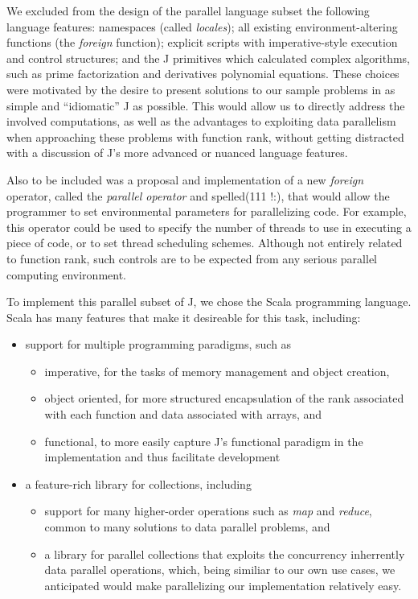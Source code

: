 We excluded from the design of the parallel language subset the following language features: 
namespaces (called \textit{locales});
all existing environment-altering functions (the \textit{foreign} function);
explicit scripts with imperative-style execution and control structures;
and the J primitives which calculated complex algorithms, such as prime factorization and derivatives polynomial equations.
These choices were motivated by the desire to present solutions to our sample problems in as simple and ``idiomatic'' J as possible.
This would allow us to directly address the involved computations, as well as the advantages to exploiting data parallelism when approaching these problems with function rank, 
without getting distracted with a discussion of J's more advanced or nuanced language features.

Also to be included was a proposal and implementation of a new \textit{foreign} operator, called the \textit{parallel operator} and spelled\ttfamily (111 !:)\normalfont , 
that would allow the programmer to set environmental parameters for parallelizing code.
For example, this operator could be used to specify the number of threads to use in executing a piece of code, 
or to set thread scheduling schemes.
Although not entirely related to function rank, such controls are to be expected from any serious parallel computing environment.

To implement this parallel subset of J, we chose the Scala programming language.\cite{scala} 
Scala has many features that make it desireable for this task, including: 
\begin{itemize} 
	\item support for multiple programming paradigms, such as
	\begin{itemize}
		\item imperative, for the tasks of memory management and object creation,
		\item object oriented, for more structured encapsulation of the rank associated with each function 
			and data associated with arrays, and
		\item functional, to more easily capture J's functional paradigm in the implementation and thus facilitate development
	\end{itemize}
	\item a feature-rich library for collections, including 
	\begin{itemize}
		\item support for many higher-order operations such as \textit{map} and \textit{reduce}, \cite{scala28col}
			common to many solutions to data parallel problems, and
		\item a library for parallel collections that exploits the concurrency inherrently data parallel operations,\cite{pc}
			which, being similiar to our own use cases, we anticipated would make parallelizing our implementation relatively easy.
	\end{itemize}
\end{itemize}

